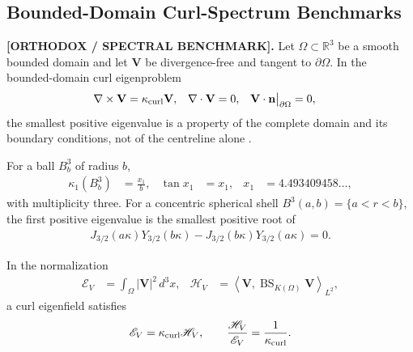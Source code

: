 \documentclass[11pt]{article}
\theoremstyle{definition}
\theoremstyle{plain}
\theoremstyle{remark}
\begin{document}
\subsection{Bounded-Domain Curl-Spectrum Benchmarks}
    \label{subsec:bounded_domain_curl_spectrum}

    \textbf{[ORTHODOX / SPECTRAL BENCHMARK].}
    Let \(\Omega\subset\mathbb{R}^3\) be a smooth bounded domain and let
    \(\mathbf{V}\) be divergence-free and tangent to \(\partial\Omega\).  In the
    bounded-domain curl eigenproblem
    \begin{align}
        \nabla\times\mathbf{V}
        &=
        \kappa_{\rm curl}\mathbf{V},
        &
        \nabla\cdot\mathbf{V}&=0,
        &
        \mathbf{V}\cdot\mathbf{n}\big|_{\partial\Omega}&=0,
        \label{eq:canon_curl_eigenproblem}
    \end{align}
    the smallest positive eigenvalue is a property of the complete domain and its
    boundary conditions, not of the centreline alone
    \cite{CantarellaDeTurckGluckTeytel2000CurlSpherical}.

    For a ball \(B_b^3\) of radius \(b\),
    \begin{align}
        \kappa_1(B_b^3)
        &=
        \frac{x_1}{b},
        &
        \tan x_1&=x_1,
        &
        x_1&=4.493409458\ldots,
        \label{eq:canon_ball_curl_eigenvalue}
    \end{align}
    with multiplicity three.  For a concentric spherical shell
    \(B^3(a,b)=\{a<r<b\}\), the first positive eigenvalue is the smallest positive
    root of
    \begin{align}
        J_{3/2}(a\kappa)Y_{3/2}(b\kappa)
        -
        J_{3/2}(b\kappa)Y_{3/2}(a\kappa)
        =0.
        \label{eq:canon_shell_curl_eigenvalue}
    \end{align}

    In the normalization
    \begin{align}
        \mathscr E_V
        &=
        \int_\Omega |\mathbf{V}|^2\,d^3x,
        &
        \mathscr H_V
        &=
        \left\langle
        \mathbf{V},\operatorname{BS}_{K(\Omega)}\mathbf{V}
        \right\rangle_{L^2},
    \end{align}
    a curl eigenfield satisfies
    \begin{align}
        \mathscr E_V
        =
        \kappa_{\rm curl}\mathscr H_V,
        \qquad
        \frac{\mathscr H_V}{\mathscr E_V}
        =
        \frac{1}{\kappa_{\rm curl}}.
        \label{eq:canon_helicity_capacity_relation}
    \end{align}
\end{document}
